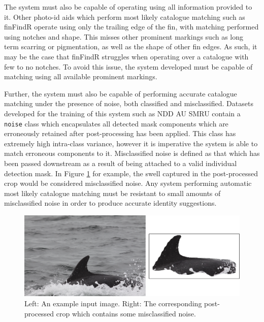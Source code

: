 The system must also be capable of operating using all information provided to it. Other photo-id aids which perform most likely catalogue matching such as finFindR \cite{thompson_finfindr_2022} operate using only the trailing edge of the fin, with matching performed using notches and shape. This misses other prominent markings such as long term scarring or pigmentation, as well as the shape of other fin edges. As such, it may be the case that finFindR struggles when operating over a catalogue with few to no notches. To avoid this issue, the system developed must be capable of matching using all available prominent markings. 

Further, the system must also be capable of performing accurate catalogue matching under the presence of noise, both classified and misclassified. Datasets developed for the training of this system such as NDD AU SMRU contain a \texttt{noise} class which encapsulates all detected mask components which are erroneously retained after post-processing has been applied. This class has extremely high intra-class variance, however it is imperative the system is able to match erroneous components to it. Misclassified noise is defined as that which has been passed downstream as a result of being attached to a valid individual detection mask. In Figure \ref{fig:crop-with-unclassified-noise} for example, the swell captured in the post-processed crop would be considered misclassified noise. Any system performing automatic most likely catalogue matching must be resistant to small amounts of misclassified noise in order to produce accurate identity suggestions.

\begin{figure}
	\begin{center}
		\includegraphics[scale=0.6]{Chapter6/figs/crop-with-unclassified-noise-updated.png}
	\end{center}
	\caption{Left: An example input image. Right: The corresponding post-processed crop which contains some misclassified noise.}
	\label{fig:crop-with-unclassified-noise}
\end{figure}

